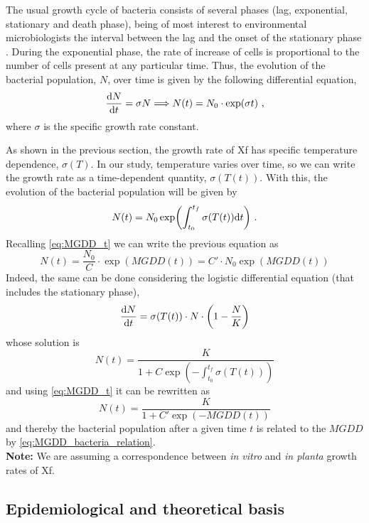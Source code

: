 The usual growth cycle of bacteria consists of several phases (lag,
exponential, stationary and death phase), being of most interest to
environmental microbiologists the interval between the lag and the onset of the
stationary phase  \cite{MAIER200937}. During the exponential phase, the rate of
increase of cells is proportional to the number of cells present at any
particular time. Thus, the evolution of the bacterial population, $N$, over
time is given by the following differential equation,
\begin{equation}
    \frac{\mathrm{d} N}{\mathrm{d} t}=\sigma N \Longrightarrow N(t)=N_0\cdot\exp(\sigma t) \ ,
\end{equation}
where $\sigma$ is the specific growth rate constant.

As shown in the previous section, the growth rate of Xf has specific
temperature dependence, $\sigma(T)$. In our study, temperature varies over
time, so we can write the growth rate as a time-dependent quantity,
$\sigma(T(t))$. With this, the evolution of the bacterial population will be
given by
\begin{equation}
    N(t)=N_0\exp(\int_{t_0}^{t_f}\sigma(T(t)) \mathrm{d} t) \ .
\end{equation}
Recalling \cref{eq:MGDD_t} we can write the previous equation as
\begin{equation}
    N(t)=\frac{N_0}{C}\cdot\exp(MGDD(t))=C'\cdot N_0\exp(MGDD(t))
\end{equation}
Indeed, the same can be done considering the logistic differential equation
(that includes the stationary phase),
\begin{equation}
    \frac{\mathrm{d} N}{\mathrm{d} t}=\sigma(T(t))\cdot N\cdot\left(1-\frac{N}{K}\right)
\end{equation}
whose solution is
\begin{equation}
    N(t)=\frac{K}{1+C\exp(-\int_{t_0}^{t_f}\sigma(T(t)))}
\end{equation}
and using \cref{eq:MGDD_t} it can be rewritten as
\begin{equation}\label{eq:MGDD_bacteria_relation}
    N(t)=\frac{K}{1+C'\exp(-MGDD(t))}
\end{equation}
and thereby the bacterial population after a given time $t$ is related to
the $MGDD$ by \cref{eq:MGDD_bacteria_relation}.\\

\textbf{Note:} We are assuming a correspondence between \textit{in vitro}
and \textit{in planta} growth rates of Xf.

\subsection{Epidemiological and theoretical basis}\label{app:SIR}

